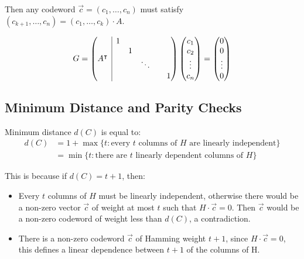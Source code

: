 \documentclass[11pt]{article}
\begin{document}
Then any codeword $\overrightarrow{c} = (c_1, \ldots, c_n)$ must satisfy $(c_{k + 1}, \ldots, c_n) = (c_1, \ldots, c_k) \cdot A$.

\[
  G = 
  \left( \begin{array}{@{}c|c@{}}
    A^\intercal &
     \begin{matrix}
        1 & & & \\
        & 1 & & \\
        & & \ddots & \\
        & & & & 1
     \end{matrix} 
  \end{array} \right)
  \begin{pmatrix}
    c_1 \\
    c_2 \\
    \vdots \\
    c_n
  \end{pmatrix}
  =
  \begin{pmatrix}
    0 \\
    0 \\
    \vdots \\
    0
  \end{pmatrix}
\]

\subsection{Minimum Distance and Parity Checks}
Minimum distance $d(C)$ is equal to:
\begin{align*}
  d(C) &= 1 + \max \{ t : \text{every } t \text{ columns of } H \text{ are linearly independent}\} \\
  &= \min\{t : \text{there are } t \text{ linearly dependent columns of } H\}
\end{align*}

This is because if $d(C) = t + 1$, then:
\begin{itemize}
  \item Every $t$ columns of $H$ must be linearly independent, otherwise there would be a non-zero vector $\overrightarrow{c}$ of weight at most $t$ such that $H \cdot \overrightarrow{c} = 0$.
    Then $\overrightarrow{c}$ would be a non-zero codeword of weight less than $d(C)$, a contradiction.
  \item There is a non-zero codeword $\overrightarrow{c}$ of Hamming weight $t + 1$, since $H \cdot \overrightarrow{c} = 0$, this defines a linear dependence between $t + 1$ of the columns of H.
\end{itemize}
\end{document}
